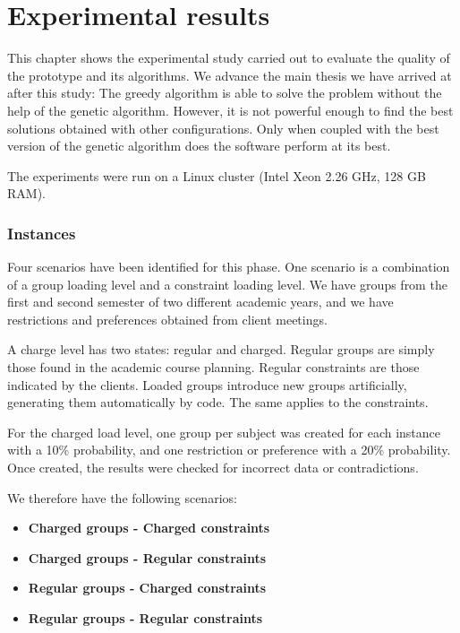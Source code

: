 \renewcommand{\documentname}{Experimental results}

\chapter{Experimental results}\label{experimental-results}

This chapter shows the experimental study carried out to evaluate the quality of the prototype and its algorithms. We advance the main thesis we have arrived at after this study: The greedy algorithm is able to solve the problem without the help of the genetic algorithm. However, it is not powerful enough to find the best solutions obtained with other configurations. Only when coupled with the best version of the genetic algorithm does the software perform at its best.

The experiments were run on a Linux cluster (Intel Xeon 2.26 GHz, 128 GB RAM).


\subsection{Instances}

Four scenarios have been identified for this phase. One scenario is a combination of a group loading level and a constraint loading level. We have groups from the first and second semester of two different academic years, and we have restrictions and preferences obtained from client meetings.

A charge level has two states: regular and charged. Regular groups are simply those found in the academic course planning. Regular constraints are those indicated by the clients. Loaded groups introduce new groups artificially, generating them automatically by code. The same applies to the constraints.

For the charged load level, one group per subject was created for each instance with a 10\% probability, and one restriction or preference with a 20\% probability. Once created, the results were checked for incorrect data or contradictions.

We therefore have the following scenarios:

\begin{itemize}
    \item \textbf{Charged groups - Charged constraints}
    \item \textbf{Charged groups - Regular constraints}
    \item \textbf{Regular groups - Charged constraints}
    \item \textbf{Regular groups - Regular constraints}
\end{itemize}


